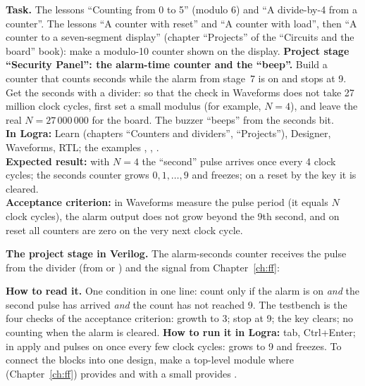 \begin{diybox}
\textbf{Task.}  The lessons ``Counting from 0 to 5'' (modulo 6) and ``A divide-by-4
from a counter''.  The lessons ``A counter with reset'' and ``A counter with load'',
then ``A counter to a seven-segment display'' (chapter ``Projects'' of the ``Circuits
and the board'' book): make a modulo-10 counter shown on the display.
 \textbf{Project stage ``Security Panel'': the alarm-time counter and the
``beep''.} Build a counter that counts seconds while the alarm from stage~7
is on and stops at 9. Get the seconds with a divider: so that
the check in Waveforms does not take 27 million clock cycles, first set a
small modulus (for example, $N=4$), and leave the real $N=27\,000\,000$ for the board.
The buzzer ``beeps'' from the seconds bit.\\
\textbf{In Logra:} Learn (chapters ``Counters and dividers'', ``Projects''), Designer, Waveforms,
RTL; the examples , , .\\
\textbf{Expected result:} with $N=4$ the ``second'' pulse arrives once every 4
clock cycles; the seconds counter grows $0,1,\ldots,9$ and freezes; on a reset by the key it
is cleared.\\
\textbf{Acceptance criterion:} in Waveforms measure the pulse period
(it equals $N$ clock cycles), the alarm output does not grow beyond the 9th second,
and on reset all counters are zero on the very next clock cycle.
\end{diybox}

\textbf{The project stage in Verilog.} The alarm-seconds counter receives the
pulse  from the divider (from  or ) and
the signal  from Chapter~\ref{ch:ff}:


\textbf{How to read it.} One condition in one line: count only if the alarm is on
\emph{and} the second pulse has arrived \emph{and} the count has not reached 9. The
testbench  is the four checks of the acceptance criterion:
growth to 3; stop at 9; the key clears; no counting when the alarm is cleared.
\textbf{How to run it in Logra:}  tab, Ctrl+Enter; in 
apply  and pulses on  once every few clock cycles:
 grows to 9 and freezes. To connect the blocks into one design, make a
top-level module where  (Chapter~\ref{ch:ff}) provides
 and  with a small  provides .

